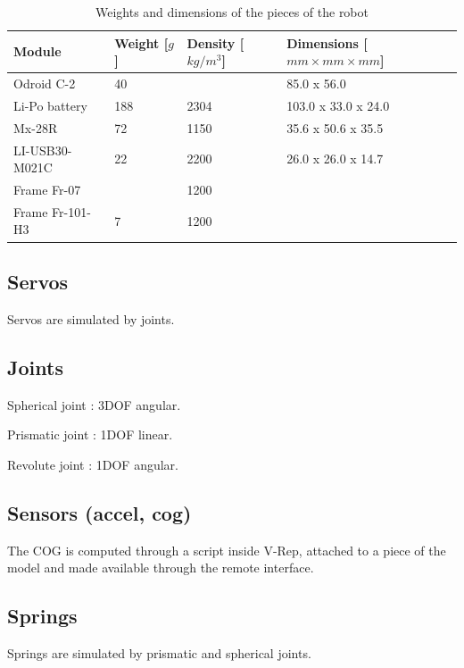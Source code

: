 \begin{table}[htp]
\center
\begin{tabularx}{\textwidth}{@{} X X X l @{}}
\toprule
\textbf{Module} & \textbf{Weight [$g$]} &  \textbf{Density [$kg/m^3$]}& \textbf{Dimensions [$mm \times mm \times mm$]}\\ 
\midrule
Odroid C-2 & 40 &  & 85.0 x 56.0\\
Li-Po battery & 188 & 2304 & 103.0 x 33.0 x 24.0\\
Mx-28R & 72 & 1150 & 35.6 x 50.6 x 35.5\\
LI-USB30-M021C & 22 & 2200 & 26.0 x 26.0 x 14.7\\
Frame Fr-07 & & 1200 & \\
Frame Fr-101-H3 & 7 & 1200 & \\
\bottomrule
\end{tabularx}
\caption{Weights and dimensions of the pieces of the robot}
\label{table:weights}
\end{table}

\subsection{Servos}
Servos are simulated by joints.

\subsection{Joints}
Spherical joint : 3DOF angular.

Prismatic joint : 1DOF linear.

Revolute joint : 1DOF angular.

\subsection{Sensors (accel, cog)}
The COG is computed through a script inside V-Rep, attached to a piece of the model and made available through the remote interface\cite{vrep_manual}.



\subsection{Springs}
Springs are simulated by prismatic and spherical joints.